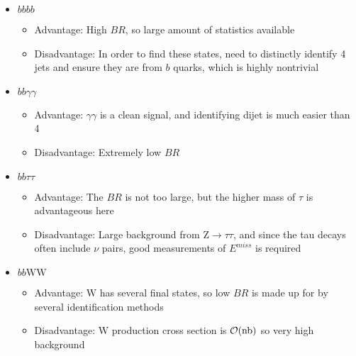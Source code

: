 \documentclass[12pt]{article}
\numberwithin{equation}{section}
\begin{document}
\begin{itemize}
\item $bbbb$
  \begin{itemize}
  \item Advantage: High $BR$, so large amount of statistics available
  \item Disadvantage: In order to find these states, need to distinctly identify 4 jets and ensure they are from $b$ quarks, which is highly nontrivial
  \end{itemize}
\item $bb\gamma\gamma$
  \begin{itemize}
  \item Advantage: $\gamma\gamma$ is a clean signal, and identifying dijet is much easier than 4
  \item Disadvantage: Extremely low $BR$
  \end{itemize}
\item $bb\tau\tau$
  \begin{itemize}
  \item Advantage: The $BR$ is not too large, but the higher mass of $\tau$ is advantageous here
  \item Disadvantage: Large background from $\mathrm{Z}\to\tau\tau$, and since the tau decays often include $\nu$ pairs, good measurements of $E^{miss}$ is required
  \end{itemize}
\item $bb\mathrm{WW}$
  \begin{itemize}
  \item Advantage: $\mathrm{W}$ has several final states, so low $BR$ is made up for by several identification methods
  \item Disadvantage: $\mathrm{W}$ production cross section is $\order{\unit{nb}}$ so very high background
  \end{itemize}
\end{itemize}
\newpage
\end{document}
